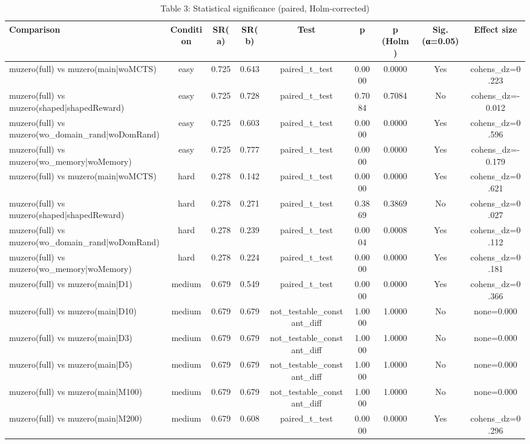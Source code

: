 \begin{table}[htbp]
\centering
\caption{Table 3: Statistical significance (paired, Holm-corrected)}
\begin{tabular}{lcccccccc}
\toprule
Comparison & Condition & SR(a) & SR(b) & Test & p & p (Holm) & Sig. (α=0.05) & Effect size \\
\midrule
muzero(full) vs muzero(main|woMCTS) & easy & 0.725 & 0.643 & paired_t_test & 0.0000 & 0.0000 & Yes & cohens_dz=0.223 \\
muzero(full) vs muzero(shaped|shapedReward) & easy & 0.725 & 0.728 & paired_t_test & 0.7084 & 0.7084 & No & cohens_dz=-0.012 \\
muzero(full) vs muzero(wo_domain_rand|woDomRand) & easy & 0.725 & 0.603 & paired_t_test & 0.0000 & 0.0000 & Yes & cohens_dz=0.596 \\
muzero(full) vs muzero(wo_memory|woMemory) & easy & 0.725 & 0.777 & paired_t_test & 0.0000 & 0.0000 & Yes & cohens_dz=-0.179 \\
muzero(full) vs muzero(main|woMCTS) & hard & 0.278 & 0.142 & paired_t_test & 0.0000 & 0.0000 & Yes & cohens_dz=0.621 \\
muzero(full) vs muzero(shaped|shapedReward) & hard & 0.278 & 0.271 & paired_t_test & 0.3869 & 0.3869 & No & cohens_dz=0.027 \\
muzero(full) vs muzero(wo_domain_rand|woDomRand) & hard & 0.278 & 0.239 & paired_t_test & 0.0004 & 0.0008 & Yes & cohens_dz=0.112 \\
muzero(full) vs muzero(wo_memory|woMemory) & hard & 0.278 & 0.224 & paired_t_test & 0.0000 & 0.0000 & Yes & cohens_dz=0.181 \\
muzero(full) vs muzero(main|D1) & medium & 0.679 & 0.549 & paired_t_test & 0.0000 & 0.0000 & Yes & cohens_dz=0.366 \\
muzero(full) vs muzero(main|D10) & medium & 0.679 & 0.679 & not_testable_constant_diff & 1.0000 & 1.0000 & No & none=0.000 \\
muzero(full) vs muzero(main|D3) & medium & 0.679 & 0.679 & not_testable_constant_diff & 1.0000 & 1.0000 & No & none=0.000 \\
muzero(full) vs muzero(main|D5) & medium & 0.679 & 0.679 & not_testable_constant_diff & 1.0000 & 1.0000 & No & none=0.000 \\
muzero(full) vs muzero(main|M100) & medium & 0.679 & 0.679 & not_testable_constant_diff & 1.0000 & 1.0000 & No & none=0.000 \\
muzero(full) vs muzero(main|M200) & medium & 0.679 & 0.608 & paired_t_test & 0.0000 & 0.0000 & Yes & cohens_dz=0.296 \\

\end{tabular}
\end{table}
